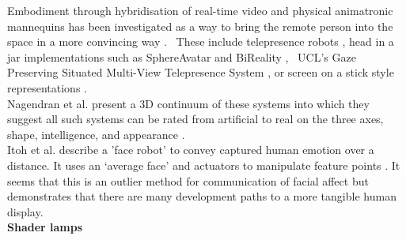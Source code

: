                     Embodiment through hybridisation of real-time video and physical animatronic mannequins has been investigated as a way to bring the remote person into the space in a more convincing way \cite{Lincoln2009, Lincoln:2010it, Raskar2001a}. \ These include telepresence robots \cite{Lee2011b, Sakamoto2007, Tsui2011}, head in a jar implementations such as SphereAvatar \cite{Oyekoya2012, pan2014comparing, Pan2012a} and BiReality \cite{Jouppi2004}, \ UCL's Gaze Preserving Situated Multi-View Telepresence System \cite{Pan2014a}, or screen on a stick style representations \cite{Kristoffersson2013}.\\  
                    Nagendran et al. present a 3D continuum of these systems into which they suggest all such systems can be rated from artificial to real on the three axes, shape, intelligence, and appearance \cite{Nagendran}.\\
                    Itoh et al. describe a 'face robot' to convey captured human emotion over a distance. It uses an `average face' and actuators to manipulate feature points \cite{Itoh2005}. It seems that this is an outlier method for communication of facial affect but demonstrates that there are many development paths to a more tangible human display.\\ 
                    
\textbf{Shader lamps}

